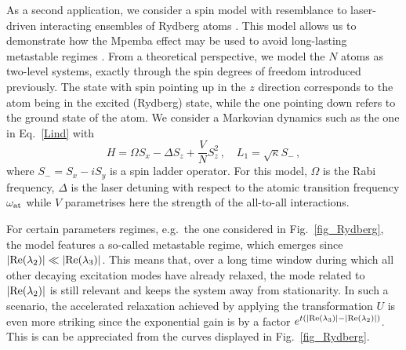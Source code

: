 \documentclass[prl,floatfix,twocolumn,superscriptaddress,showpacs,preprintnumbers,longbibliography,nofootinbib]{revtex4-1}
\begin{document}
 As a second application, we consider a spin model with resemblance to laser-driven interacting ensembles of Rydberg atoms \cite{bloch2008,saffman2010,lee2012,kshetrimayum2017,letscher2017}. This model allows us to demonstrate how the Mpemba effect may be used to avoid long-lasting metastable regimes \cite{macieszczak2016,rose2016,letscher2017}. From a theoretical perspective, we model the $N$ atoms as two-level systems, exactly through the spin degrees of freedom introduced previously. The state with spin pointing up in the $z$ direction corresponds to the atom being in the excited (Rydberg) state, while the one pointing down refers to the ground state of the atom. We consider a Markovian dynamics such as the one in Eq.~\eqref{Lind} with
$$
H=\Omega S_x-\Delta S_z+\frac{V}{N}S_z^2\, , \quad L_1=\sqrt{\kappa}S_-\, ,
$$
where $S_-=S_x-iS_y$ is a spin ladder operator. For this model, $\Omega$ is the Rabi frequency, $\Delta$ is the laser detuning with respect to the atomic transition frequency $\omega_{\rm at}$ while $V$ parametrises here the strength of the all-to-all interactions. 

For certain parameters regimes, e.g.~the one considered in Fig.~\ref{fig_Rydberg}, the model features a so-called metastable regime, which emerges since $|{\rm Re}(\lambda_2)|\ll |{\rm Re}(\lambda_3)|$. This means that, over a long time window during which all other decaying excitation modes have already relaxed, the mode related to $|{\rm Re}(\lambda_2)|$ is still relevant and keeps the system away from stationarity. In such a scenario, the accelerated relaxation achieved by applying the transformation $U$ is even more striking since the exponential gain is by a factor $e^{t\left(|{\rm Re}(\lambda_3)|-|{\rm Re}(\lambda_2)|\right)}$. This is can be appreciated from the curves displayed in Fig.~\eqref{fig_Rydberg}.
\end{document}
